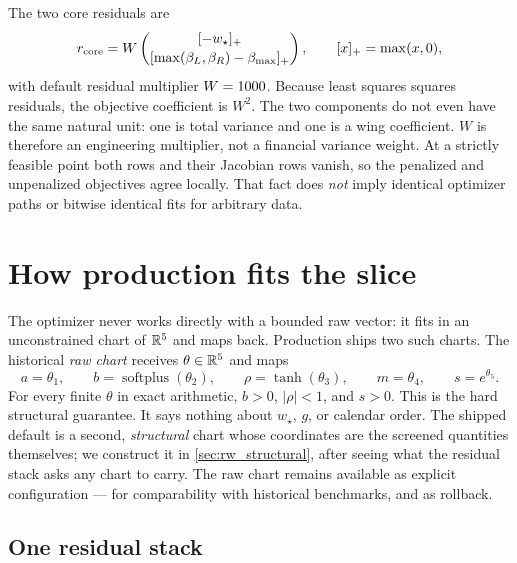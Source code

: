 \documentclass[11pt]{article}
\newcommand{\wmin}{w_\star}
\newcommand{\betL}{\beta_L}
\newcommand{\betR}{\beta_R}
\begin{document}
The two core residuals are
\begin{equation}
r_{\rm core}=W
\begin{pmatrix}
[-\wmin]_+\\[2pt]
[\max(\betL,\betR)-\beta_{\max}]_+
\end{pmatrix},
\qquad [x]_+=\max(x,0),
\label{eq:rw_core_rows}
\end{equation}
with default residual multiplier $W=1000$.  Because least squares
squares residuals, the objective coefficient is $W^2$.  The two components do
not even have the same natural unit: one is total variance and one is a wing
coefficient.  $W$ is therefore an engineering multiplier, not a financial
variance weight.  At a strictly feasible point both rows and their Jacobian
rows vanish, so the penalized and unpenalized objectives agree locally.  That
fact does \emph{not} imply identical optimizer paths or bitwise identical fits
for arbitrary data.

\section{How production fits the slice}
\label{sec:rw_calibration}

The optimizer never works directly with a bounded raw vector: it fits in an
unconstrained chart of $\mathbb{R}^5$ and maps back.  Production ships two such
charts.  The historical \emph{raw chart} receives $\theta\in\mathbb{R}^5$ and maps
\begin{equation}
a=\theta_1,\qquad
b=\operatorname{softplus}(\theta_2),\qquad
\rho=\tanh(\theta_3),\qquad
m=\theta_4,\qquad
s=e^{\theta_5}.
\label{eq:rw_reparam}
\end{equation}
For every finite $\theta$ in exact arithmetic, $b>0$, $|\rho|<1$, and $s>0$.
This is the hard structural guarantee.  It says nothing about $\wmin$, $g$, or
calendar order.  The shipped default is a second, \emph{structural} chart
whose coordinates are the screened quantities themselves; we construct it in
\cref{sec:rw_structural}, after seeing what the residual stack asks any chart
to carry.  The raw chart remains available as explicit configuration --- for
comparability with historical benchmarks, and as rollback.

\subsection{One residual stack}
\end{document}
